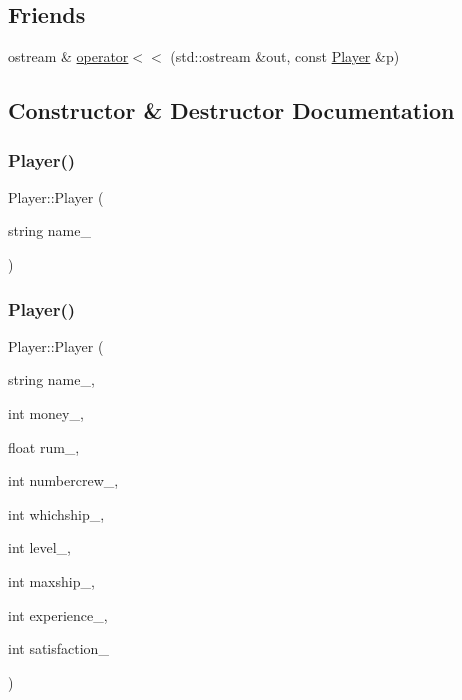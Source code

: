 \subsection*{Friends}
\begin{DoxyCompactItemize}
\item 
ostream \& \hyperlink{class_player_a8df091e01a62dda54c43c277fe953118}{operator$<$$<$} (std\+::ostream \&out, const \hyperlink{class_player}{Player} \&p)
\end{DoxyCompactItemize}


\subsection{Constructor \& Destructor Documentation}
\mbox{\label{class_player_a3c3ccb417f0a1afa1efdc882a8097718}} 
\subsubsection{\texorpdfstring{Player()}{Player()}\hspace{0.1cm}{\footnotesize\ttfamily [1/2]}}
{\footnotesize\ttfamily Player\+::\+Player (\begin{DoxyParamCaption}\item[{string}]{name\+\_\+ }\end{DoxyParamCaption})\hspace{0.3cm}{\ttfamily [inline]}}

\mbox{\label{class_player_a32efbe7a5af55d105409031f5706cd0f}} 
\subsubsection{\texorpdfstring{Player()}{Player()}\hspace{0.1cm}{\footnotesize\ttfamily [2/2]}}
{\footnotesize\ttfamily Player\+::\+Player (\begin{DoxyParamCaption}\item[{string}]{name\+\_\+,  }\item[{int}]{money\+\_\+,  }\item[{float}]{rum\+\_\+,  }\item[{int}]{numbercrew\+\_\+,  }\item[{int}]{whichship\+\_\+,  }\item[{int}]{level\+\_\+,  }\item[{int}]{maxship\+\_\+,  }\item[{int}]{experience\+\_\+,  }\item[{int}]{satisfaction\+\_\+ }\end{DoxyParamCaption})\hspace{0.3cm}{\ttfamily [inline]}}




